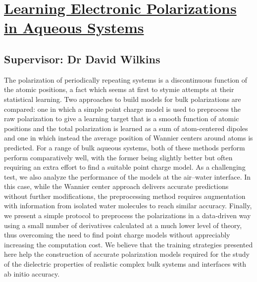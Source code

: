 \section{\href{https://doi.org/10.1021/acs.jcim.4c00421}{Learning Electronic Polarizations in Aqueous Systems}}

\subsection*{Supervisor: Dr David Wilkins}


The polarization of periodically repeating systems is a discontinuous function of the atomic positions, a fact which seems at first to stymie attempts at their statistical learning. Two approaches to build models for bulk polarizations are compared: one in which a simple point charge model is used to preprocess the raw polarization to give a learning target that is a smooth function of atomic positions and the total polarization is learned as a sum of atom-centered dipoles and one in which instead the average position of Wannier centers around atoms is predicted. For a range of bulk aqueous systems, both of these methods perform perform comparatively well, with the former being slightly better but often requiring an extra effort to find a suitable point charge model. As a challenging test, we also analyze the performance of the models at the air–water interface. In this case, while the Wannier center approach delivers accurate predictions without further modifications, the preprocessing method requires augmentation with information from isolated water molecules to reach similar accuracy. Finally, we present a simple protocol to preprocess the polarizations in a data-driven way using a small number of derivatives calculated at a much lower level of theory, thus overcoming the need to find point charge models without appreciably increasing the computation cost. We believe that the training strategies presented here help the construction of accurate polarization models required for the study of the dielectric properties of realistic complex bulk systems and interfaces with ab initio accuracy.
